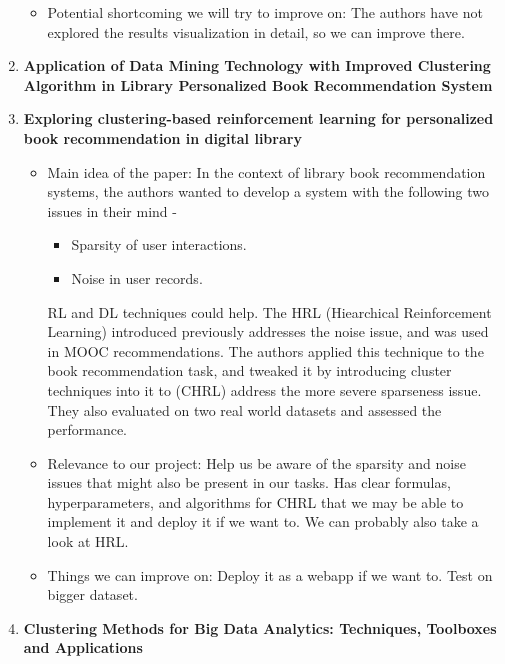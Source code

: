 \begin{enumerate}[label=(\arabic*)]
\begin{itemize}
        \item Potential shortcoming we will try to improve on: The authors have not explored the results visualization in detail, so we can improve there.
    \end{itemize}
    \item \cite{lin2023application} \textbf{Application of Data Mining Technology with Improved Clustering Algorithm in Library Personalized Book Recommendation System}
    \item \cite{wang2021exploring} \textbf{Exploring clustering-based reinforcement learning for personalized book recommendation in digital library}
    \begin{itemize}
        \item Main idea of the paper: In the context of library book recommendation systems, the authors wanted to develop a system with the following two issues in their mind -
        \begin{itemize}
            \item Sparsity of user interactions.
            \item Noise in user records.
        \end{itemize}
        RL and DL techniques could help. The HRL (Hiearchical Reinforcement Learning) introduced previously addresses the noise issue, and was used in MOOC recommendations. The authors applied this technique to the book recommendation task, and tweaked it by introducing cluster techniques into it to (CHRL) address the more severe sparseness issue. They also evaluated on two real world datasets and assessed the performance.
        \item Relevance to our project: Help us be aware of the sparsity and noise issues that might also be present in our tasks. Has clear formulas, hyperparameters, and algorithms for CHRL that we may be able to implement it and deploy it if we want to. We can probably also take a look at HRL.
        \item Things we can improve on: Deploy it as a webapp if we want to. Test on bigger dataset.
    \end{itemize}
    \item \cite{nasraoui2019clustering} \textbf{Clustering Methods for Big Data Analytics: Techniques, Toolboxes and Applications}

\end{enumerate}
